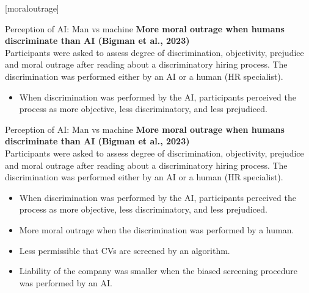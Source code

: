 \documentclass[8pt]{beamer}
\begin{document}
	[moraloutrage]

	\begin{frame}[t]{Perception of AI: Man vs machine}
		\textbf{More moral outrage when humans discriminate than AI (Bigman et al., 2023)}\\
		Participants were asked to assess degree of discrimination, objectivity, prejudice and moral outrage after reading about a discriminatory hiring process. The discrimination was performed either by an AI or a human (HR specialist).
		\begin{itemize}
			\item When discrimination was performed by the AI, participants perceived the process as more objective, less discriminatory, and less prejudiced.
		\end{itemize}
		\vspace{0.5cm}
		\centering
	\end{frame}

	\begin{frame}[t]{Perception of AI: Man vs machine}
		\textbf{More moral outrage when humans discriminate than AI (Bigman et al., 2023)}\\
		Participants were asked to assess degree of discrimination, objectivity, prejudice and moral outrage after reading about a discriminatory hiring process. The discrimination was performed either by an AI or a human (HR specialist).
		\begin{itemize}
			\item When discrimination was performed by the AI, participants perceived the process as more objective, less discriminatory, and less prejudiced.
			\item More moral outrage when the discrimination was performed by a human.
			\item Less permissible that CVs are screened by an algorithm.
			\item Liability of the company was smaller when the biased screening procedure was performed by an AI.
		\end{itemize}
	\end{frame}
\end{document}
